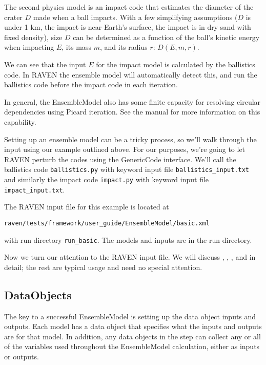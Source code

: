 The second physics model is an impact code that estimates the diameter of the crater $D$ made when a ball
impacts.  With a few simplifying assumptions ($D$ is under 1 km, the impact is near Earth's surface, the
impact is in dry sand with fixed density), size $D$ can be determined as a function of the ball's kinetic
energy when impacting $E$, its mass $m$, and its radius $r$: $D(E,m,r)$.

We can see that the input $E$ for the impact model is calculated by the ballistics code.  In RAVEN the
ensemble model will automatically detect this, and run the ballistics code before the impact code in each
iteration.

In general, the EnsembleModel also has some finite capacity for resolving circular dependencies using Picard
iteration.  See the manual for more information on this capability.

Setting up an ensemble model can be a tricky process, so we'll walk through the input using our example
outlined above.  For
our purposes, we're going to let RAVEN perturb the codes using the GenericCode interface.  We'll call the
ballistics code \texttt{ballistics.py} with keyword input file \texttt{ballistics\_input.txt} and similarly the impact
code \texttt{impact.py} with keyword input file \texttt{impact\_input.txt}.

The RAVEN input file for this example is located at
\begin{verbatim}
raven/tests/framework/user_guide/EnsembleModel/basic.xml
\end{verbatim}
with run directory \texttt{run\_basic}.  The models and inputs are in the run directory.

Now we turn our attention to the RAVEN input file. We will discuss , ,
, and  in detail; the rest are typical usage and need no special attention.

\subsection{DataObjects}
The key to a successful EnsembleModel is setting up the data object inputs and outputs.  Each model has a
 data object that specifies what the inputs and outputs are for that model.  In
addition, any  data objects in the  step can collect any or all of the
variables used throughout the EnsembleModel calculation, either as inputs or outputs.

